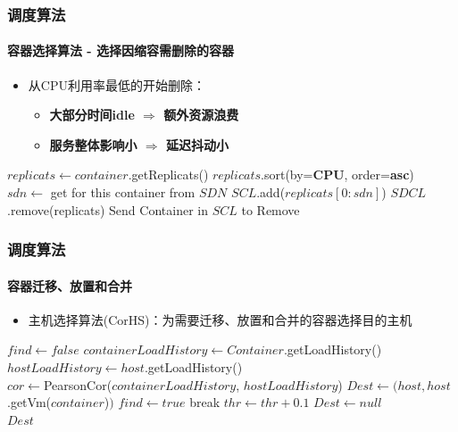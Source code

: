 \begin{frame}
\frametitle{调度算法}
\framesubtitle{容器选择算法 - 选择因缩容需删除的容器}
\begin{itemize}
    \item 从CPU利用率最低的开始删除：
    \begin{itemize}
        \item \textbf{大部分时间idle $\Rightarrow$ 额外资源浪费}
        \item \textbf{服务整体影响小 $\Rightarrow$ 延迟抖动小}
    \end{itemize}
\end{itemize}
\begin{algorithmic}[1]
     
    \State $replicats \gets container$.getReplicats()   
    \State $replicats$.sort(by=\textbf{CPU}, order=\textbf{asc})    
    \State $sdn \gets$ get for this container from $SDN$    
    \State $SCL$.add($replicats[0:sdn]$)    
    \State $SDCL$.remove(replicats) 
  \EndFor
  \State Send Container in $SCL$ to Remove
  \end{algorithmic}
\bigskip
\end{frame}

\begin{frame}[allowframebreaks]
\frametitle{调度算法}
\framesubtitle{容器迁移、放置和合并}
\begin{itemize}
    \item 主机选择算法(CorHS)：为需要迁移、放置和合并的容器选择目的主机
\end{itemize}
\begin{algorithmic}[1]
   \State $find \gets false$
   \State $containerLoadHistory \gets Container$.getLoadHistory()
       
     \State $hostLoadHistory \gets host$.getLoadHistory()\\
     \State $cor \gets$PearsonCor($containerLoadHistory $, $hostLoadHistory$)
      
         \State $Dest \gets (host, host$.getVm($container$)$)$
         \State $find \gets true$
         \State break
       \EndIf
     \EndIf
   \EndFor
   \State $thr \gets thr+0.1$ 
     \State $Dest \gets null$
   \EndIf
   \EndWhile \\
   \Return $Dest$
\end{algorithmic}
\end{frame}

